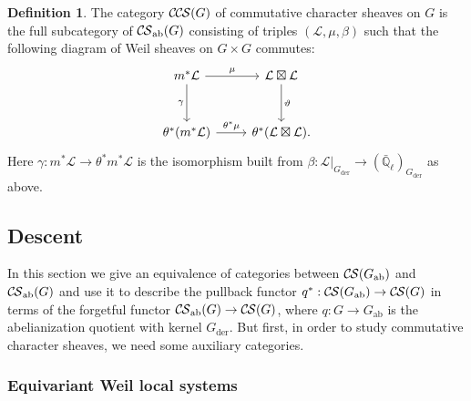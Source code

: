 \documentclass[10pt]{amsart}
\theoremstyle{plain}
\theoremstyle{definition}
\newtheorem{definition}[theorem]{Definition}
\newcommand{\EE}{\mathbb{\bar Q}_\ell}
\newcommand{\der}{_{\operatorname{der}}}
\newcommand{\ab}{_{\operatorname{ab}}}
\newcommand{\cs}[1]{{\mathcal{#1}}}
\newcommand{\CS}{{\mathcal{C\hskip-0.8pt S}}}
\newcommand{\CCS}{{\mathcal{C\hskip-.8pt C\hskip-0.8pt S}}}
\begin{document}
\begin{definition}\label{def:CCS}
The category $\CCS(G)$ of commutative character sheaves on $G$ is the full subcategory of $\CS\ab(G)$ consisting of triples $(\cs{L},\mu,\beta)$ such that the following diagram of Weil sheaves on $G \times G$ commutes:
  \[
  \begin{tikzcd}[row sep=30]
   m^*\cs{L} \arrow{d}[swap]{\gamma} \arrow{r}{\mu} & \cs{L}\boxtimes\cs{L} \arrow{d}{\vartheta}\\
   \theta^*(m^*\cs{L}) \arrow{r}{{\theta}^*\mu} &  \theta^*(\cs{L}\boxtimes\cs{L}).
  \end{tikzcd}
  \]
Here $\gamma : m^*\cs{L} \to \theta^* m^* \cs{L}$ is the isomorphism built from $\beta : \cs{L}\vert_{G\der} \to (\EE)_{G\der}$ as above. 
\end{definition}


\subsection{Descent}\label{ssec:descent}

In this section we give an equivalence of categories between $\CS(G\ab)$ and $\CS\ab(G)$ and use it to describe
the pullback functor $q^* : \CS(G\ab) \to \CS(G)$ in terms of the forgetful functor $\CS\ab(G) \to \CS(G)$, where $q : G\to G\ab$ is the abelianization quotient with kernel $G\der$.
But first, in order to study commutative character sheaves, we need some auxiliary categories.

\subsubsection{Equivariant Weil local systems}\label{ssec:equivariant1}
\end{document}
